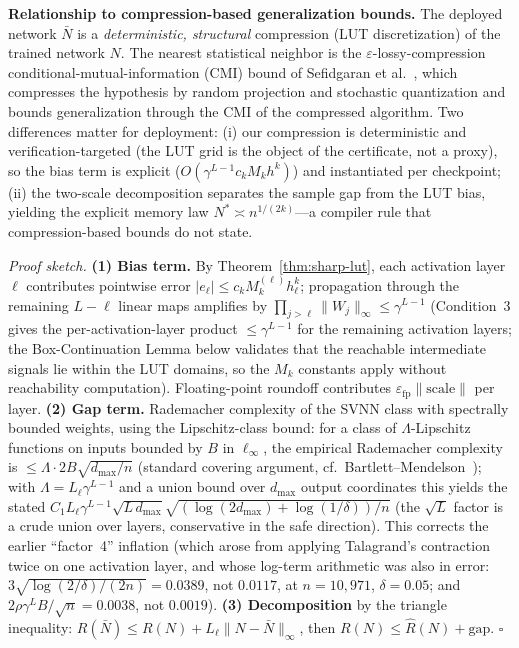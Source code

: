 \vspace{2pt}
\noindent\textbf{Relationship to compression-based generalization bounds.}
The deployed network $\bar{N}$ is a \emph{deterministic, structural}
compression (LUT discretization) of the trained network $N$. The nearest
statistical neighbor is the $\varepsilon$-lossy-compression
conditional-mutual-information (CMI) bound of
Sefidgaran et al.~\cite{sefidgaran2025cmi}, which compresses the hypothesis
by random projection and stochastic quantization and bounds generalization
through the CMI of the compressed algorithm. Two differences matter for
deployment: (i) our compression is deterministic and verification-targeted
(the LUT grid is the object of the certificate, not a proxy), so the bias
term is explicit ($O(\gamma^{L-1}c_kM_kh^k)$) and instantiated per
checkpoint; (ii) the two-scale decomposition separates the sample gap from
the LUT bias, yielding the explicit memory law
$N^{*} \asymp n^{1/(2k)}$---a compiler rule that compression-based bounds
do not state.

\vspace{2pt}
\noindent\textit{Proof sketch.}
\textbf{(1) Bias term.} By Theorem~\ref{thm:sharp-lut}, each activation
layer $\ell$ contributes pointwise error $|e_\ell| \leq c_k M_k^{(\ell)}
h_\ell^k$; propagation through the remaining $L-\ell$ linear maps amplifies
by $\prod_{j>\ell} \|W_j\|_\infty \leq \gamma^{L-1}$ (Condition~3 gives the
per-activation-layer product $\leq \gamma^{L-1}$ for the remaining
activation layers; the Box-Continuation Lemma below validates that the
reachable intermediate signals lie within the LUT domains, so the $M_k$
constants apply without reachability computation). Floating-point
roundoff contributes $\varepsilon_{\mathrm{fp}}\|\mathrm{scale}\|$ per
layer. \textbf{(2) Gap term.} Rademacher complexity of the SVNN class
with spectrally bounded weights, using the Lipschitz-class bound:
for a class of $\Lambda$-Lipschitz functions on inputs bounded by $B$
in $\ell_\infty$, the empirical Rademacher complexity is
$\leq \Lambda \cdot 2B\sqrt{d_{\max}/n}$
(standard covering argument, cf.\ Bartlett--Mendelson~\cite{bartlett2002rademacher});
with $\Lambda = L_\ell \gamma^{L-1}$ and a union bound over $d_{\max}$
output coordinates this yields the stated $C_1 L_\ell \gamma^{L-1}
\sqrt{L\, d_{\max}} \sqrt{(\log(2d_{\max}) + \log(1/\delta))/n}$
(the $\sqrt{L}$ factor is a crude union over layers, conservative in the
safe direction). This corrects the earlier ``factor~4'' inflation (which
arose from applying Talagrand's contraction twice on one activation
layer, and whose log-term arithmetic was also in error:
$3\sqrt{\log(2/\delta)/(2n)} = 0.0389$, not $0.0117$, at
$n = 10{,}971$, $\delta = 0.05$; and $2\rho\gamma^L B /
\sqrt{n} = 0.0038$, not $0.0019$). \textbf{(3) Decomposition} by the
triangle inequality: $R(\bar{N}) \leq R(N) + L_\ell \|N - \bar{N}\|_\infty$,
then $R(N) \leq \hat{R}(N) + \mathrm{gap}$. $\square$

